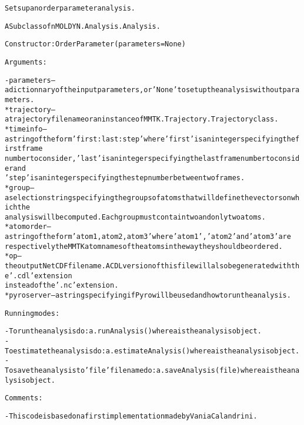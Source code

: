 \begin{alltt}
Sets up an order parameter analysis.

A Subclass of nMOLDYN.Analysis.Analysis. 

Constructor: OrderParameter({\textbar}parameters{\textbar} = None)

Arguments:

    - {\textbar}parameters{\textbar} -- a dictionnary of the input parameters, or 'None' to set up the analysis without parameters.
        * trajectory         -- a trajectory file name or an instance of MMTK.Trajectory.Trajectory class.
        * timeinfo           -- a string of the form 'first:last:step' where 'first' is an integer specifying the first frame 
                                number to consider, 'last' is an integer specifying the last frame number to consider and 
                                'step' is an integer specifying the step number between two frames.
        * group              -- a selection string specifying the groups of atoms that will define the vectors on which the 
                                analysis will be computed. Each group must contain two and only two atoms.
        * atomorder          -- a string of the form 'atom1,atom2,atom3' where 'atom1', 'atom2' and 'atom3' are 
                                respectively the MMTK atom names of the atoms in the way they should be ordered.
        * op                 -- the output NetCDF file name. A CDL version of this file will also be generated with the '.cdl' extension
                                instead of the '.nc' extension.
        * pyroserver         -- a string specifying if Pyro will be used and how to run the analysis.

Running modes:

    - To run the analysis do: a.runAnalysis() where a is the analysis object.
    - To estimate the analysis do: a.estimateAnalysis() where a is the analysis object.
    - To save the analysis to 'file' file name do: a.saveAnalysis(file) where a is the analysis object.


Comments:

    - This code is based on a first implementation made by Vania Calandrini.
\end{alltt}



